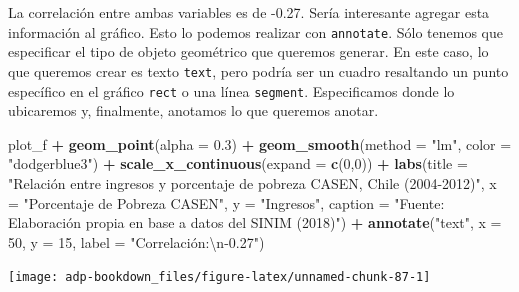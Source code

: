 \documentclass[]{book}
\newenvironment{Shaded}{\begin{snugshade}}{\end{snugshade}}
\newcommand{\CharTok}[1]{\textcolor[rgb]{0.31,0.60,0.02}{#1}}
\newcommand{\CommentTok}[1]{\textcolor[rgb]{0.56,0.35,0.01}{\textit{#1}}}
\newcommand{\DataTypeTok}[1]{\textcolor[rgb]{0.13,0.29,0.53}{#1}}
\newcommand{\DecValTok}[1]{\textcolor[rgb]{0.00,0.00,0.81}{#1}}
\newcommand{\FloatTok}[1]{\textcolor[rgb]{0.00,0.00,0.81}{#1}}
\newcommand{\KeywordTok}[1]{\textcolor[rgb]{0.13,0.29,0.53}{\textbf{#1}}}
\newcommand{\NormalTok}[1]{#1}
\newcommand{\OperatorTok}[1]{\textcolor[rgb]{0.81,0.36,0.00}{\textbf{#1}}}
\newcommand{\StringTok}[1]{\textcolor[rgb]{0.31,0.60,0.02}{#1}}
\begin{document}
\begin{Shaded}
\end{Shaded}

La correlación entre ambas variables es de -0.27. Sería interesante
agregar esta información al gráfico. Esto lo podemos realizar con
\texttt{annotate}. Sólo tenemos que especificar el tipo de objeto
geométrico que queremos generar. En este caso, lo que queremos crear es
texto \texttt{text}, pero podría ser un cuadro resaltando un punto
específico en el gráfico \texttt{rect} o una línea \texttt{segment}.
Especificamos donde lo ubicaremos y, finalmente, anotamos lo que
queremos anotar.

\begin{Shaded}
\begin{Highlighting}[]
\NormalTok{plot_f }\OperatorTok{+}\StringTok{ }
\StringTok{  }\KeywordTok{geom_point}\NormalTok{(}\DataTypeTok{alpha =} \FloatTok{0.3}\NormalTok{) }\OperatorTok{+}
\StringTok{  }\KeywordTok{geom_smooth}\NormalTok{(}\DataTypeTok{method =} \StringTok{"lm"}\NormalTok{, }\DataTypeTok{color =} \StringTok{"dodgerblue3"}\NormalTok{) }\OperatorTok{+}
\StringTok{  }\KeywordTok{scale_x_continuous}\NormalTok{(}\DataTypeTok{expand =} \KeywordTok{c}\NormalTok{(}\DecValTok{0}\NormalTok{,}\DecValTok{0}\NormalTok{)) }\OperatorTok{+}
\StringTok{  }\KeywordTok{labs}\NormalTok{(}\DataTypeTok{title =} \StringTok{"Relación entre ingresos y porcentaje de pobreza CASEN, Chile (2004-2012)"}\NormalTok{, }
       \DataTypeTok{x =} \StringTok{"Porcentaje de Pobreza CASEN"}\NormalTok{, }\DataTypeTok{y =} \StringTok{"Ingresos"}\NormalTok{, }
       \DataTypeTok{caption =} \StringTok{"Fuente: Elaboración propia en base a datos del SINIM (2018)"}\NormalTok{) }\OperatorTok{+}
\StringTok{  }\KeywordTok{annotate}\NormalTok{(}\StringTok{"text"}\NormalTok{, }\DataTypeTok{x =} \DecValTok{50}\NormalTok{, }\DataTypeTok{y =} \DecValTok{15}\NormalTok{, }\DataTypeTok{label =} \StringTok{"Correlación:}\CharTok{\textbackslash{}n}\StringTok{-0.27"}\NormalTok{)}
\end{Highlighting}
\end{Shaded}

\begin{center}\texttt{[image: adp-bookdown\_files/figure-latex/unnamed-chunk-87-1]} \end{center}
\end{document}
